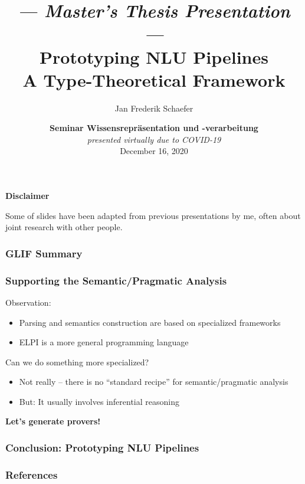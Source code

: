 \documentclass[aspectratio=169]{beamer}
\title{{\footnotesize\itshape --- Master's Thesis Presentation ---}\\[1pt] Prototyping NLU Pipelines\\[3pt] \normalsize A Type-Theoretical Framework}
\author{Jan Frederik Schaefer}
\institute{FAU Erlangen-N\"urnberg}
\date{\textbf{Seminar Wissensrepr\"asentation und -verarbeitung} \\ \textit{presented virtually due to COVID-19} \\ December 16, 2020 }
\begin{document}
\frame\titlepage

\begin{frame}
    \centering
    \textbf{Disclaimer}

    \vspace{1em}
    Some of slides have been adapted from previous presentations by me,
    often about joint research with other people.
\end{frame}






{
    
}






\begin{frame}
    \frametitle{GLIF Summary}
    
\end{frame}

\begin{frame}
    \frametitle{Supporting the Semantic/Pragmatic Analysis}
    Observation:
    \begin{itemize}
        \item Parsing and semantics construction are based on specialized frameworks
        \item ELPI is a more general programming language
    \end{itemize}
    
    \vspace{1em}
    Can we do something more specialized?
    \begin{itemize}
        \item Not really -- there is no ``standard recipe'' for
            semantic/pragmatic analysis
        \item But: It usually involves inferential reasoning
    \end{itemize}

    \vspace{2em}
    \centering
    \bfseries Let's generate provers!\par
\end{frame}



\begin{frame}
    \frametitle{Conclusion: Prototyping NLU Pipelines}
    
\end{frame}

\appendix

\begin{frame}[allowframebreaks,t]
    \frametitle{References}
    \printbibliography
\end{frame}
\end{document}
